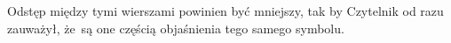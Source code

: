 \documentclass[a4paper,11pt]{article}
\numberwithin{equation}{section}
\newtheorem{theorem}{Twierdzenie}
\begin{document}
\VerSpaceFour





\noindent
{} Odstęp między tymi wierszami powinien być
mniejszy, tak by Czytelnik od razu zauważył, że~są one częścią objaśnienia
tego samego symbolu.





























\end{document}
